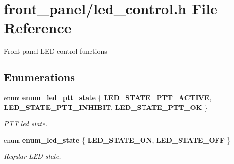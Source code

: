 \section{front\_\-panel/led\_\-control.h File Reference}
\label{led__control_8h}
Front panel LED control functions.  


\subsection*{Enumerations}
\begin{CompactItemize}
\item 
enum {\bf enum\_\-led\_\-ptt\_\-state} \{ {\bf LED\_\-STATE\_\-PTT\_\-ACTIVE}, 
{\bf LED\_\-STATE\_\-PTT\_\-INHIBIT}, 
{\bf LED\_\-STATE\_\-PTT\_\-OK}
 \}
\begin{CompactList}\small\item\em PTT led state. \item\end{CompactList}\item 
enum {\bf enum\_\-led\_\-state} \{ {\bf LED\_\-STATE\_\-ON}, 
{\bf LED\_\-STATE\_\-OFF}
 \}
\begin{CompactList}\small\item\em Regular LED state. \item\end{CompactList}\end{CompactItemize}
